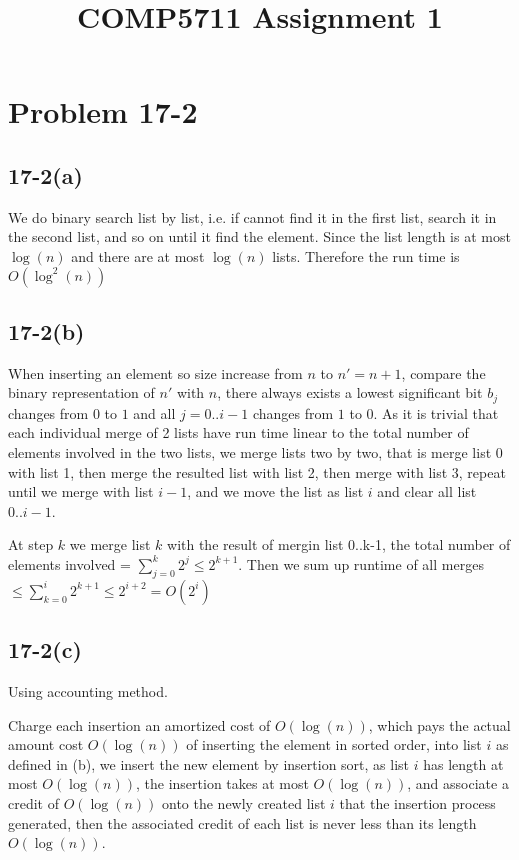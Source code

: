 \documentclass[12pt]{article}
\begin{document}
  
  \title{COMP5711 Assignment 1}

  \section*{Problem 17-2}
  \subsection*{17-2(a)}


  We do binary search list by list,
  i.e. if cannot find it in the first list,
  search it in the second list,
  and so on until it find the element.
  Since the list length is at most $\log(n)$
  and there are at most $\log(n)$ lists.
  Therefore the run time is $O(\log^2(n))$

  \subsection*{17-2(b)}


  When inserting an element so size increase from $n$ to $n'=n+1$,
  compare the binary representation of $n'$ with $n$, there always exists a lowest significant bit $b_j$
  changes from $0$ to $1$ and all $j=0..i-1$ changes from $1$ to $0$.
  As it is trivial that each individual merge of 2 lists have run time
  linear to the total number of elements involved in the two lists,
  we merge lists two by two,
  that is merge list 0 with list 1, then merge the resulted list with list 2,
  then merge with list 3, repeat until we merge with list $i-1$,
  and we move the list as list $i$ and clear all list $0..i-1$.

  At step $k$ we merge list $k$ with the result of mergin list 0..k-1,
  the total number of elements involved = $\sum_{j=0}^k 2^j \le 2^{k+1}$.
  Then we sum up runtime of all merges $\le \sum_{k=0}^i 2^{k+1} \le 2^{i+2} = O(2^i)$

  \subsection*{17-2(c)}


  Using accounting method.

  Charge each insertion an amortized cost of $O(\log(n))$,
  which pays the actual amount cost $O(\log(n))$ of inserting the element in sorted order,
  into list $i$ as defined in (b),
  we insert the new element by insertion sort,
  as list $i$ has length at most $O(\log(n))$,
  the insertion takes at most $O(\log(n))$,
  and associate a credit of $O(\log(n))$ onto the newly created list $i$ that the insertion process generated,
  then the associated credit of each list is never less than its length $O(\log(n))$.
\end{document}
